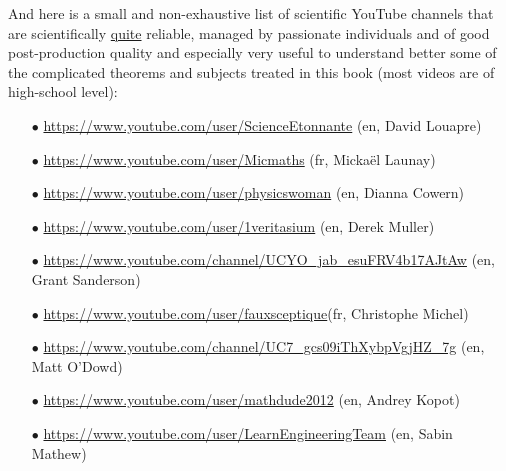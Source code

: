 	\pagebreak
	And here is a small and non-exhaustive list of scientific YouTube channels that are scientifically \underline{quite} reliable, managed by passionate individuals and of good post-production quality and especially very useful to understand better some of the complicated theorems and subjects treated in this book (most videos are of high-school level):
	\begin{itemize}
		 \item[$\bullet$] \href{https://www.youtube.com/user/ScienceEtonnante}{\color{blue}https://www.youtube.com/user/ScienceEtonnante} (en, David Louapre)
		 
		 \item[$\bullet$] \href{https://www.youtube.com/user/Micmaths}{\color{blue}https://www.youtube.com/user/Micmaths} (fr, Mickaël Launay)
		 
		 \item[$\bullet$]  \href{https://www.youtube.com/user/physicswoman}{\color{blue}https://www.youtube.com/user/physicswoman} (en, Dianna Cowern)
		 
		 \item[$\bullet$] \href{https://www.youtube.com/user/1veritasium}{\color{blue}https://www.youtube.com/user/1veritasium} (en, Derek Muller)
		 
		 \item[$\bullet$] \href{https://www.youtube.com/channel/UCYO_jab_esuFRV4b17AJtAw}{\color{blue}https://www.youtube.com/channel/UCYO\_jab\_esuFRV4b17AJtAw} (en, Grant Sanderson)
		 
		 \item[$\bullet$] \href{https://www.youtube.com/user/fauxsceptique}{\color{blue}https://www.youtube.com/user/fauxsceptique}(fr, Christophe Michel)
		 
		 \item[$\bullet$] \href{https://www.youtube.com/channel/UC7_gcs09iThXybpVgjHZ_7g}{\color{blue}https://www.youtube.com/channel/UC7\_gcs09iThXybpVgjHZ\_7g} (en, Matt O'Dowd)
		 
		 \item[$\bullet$] \href{https://www.youtube.com/user/mathdude2012}{\color{blue}https://www.youtube.com/user/mathdude2012} (en, Andrey Kopot)
		 
		 \item[$\bullet$] \href{https://www.youtube.com/user/LearnEngineeringTeam}{\color{blue}https://www.youtube.com/user/LearnEngineeringTeam} (en, Sabin Mathew)
	\end{itemize}

